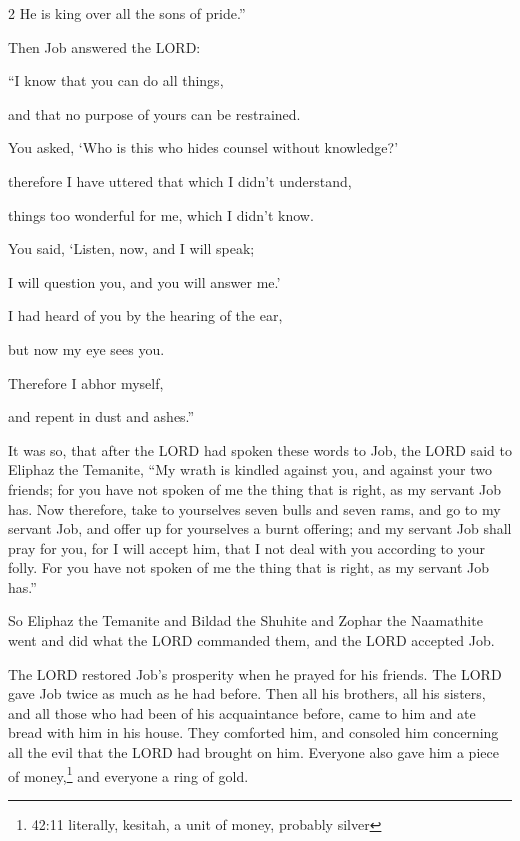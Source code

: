 \begin{multicols}{2}
	He is king over all the sons of pride.”
	
	
	
	\mychapter{} \myverse*{}Then Job answered the LORD:
	
\quad\quad	\myverse{}“I know that you can do all things,
	
	and that no purpose of yours can be restrained.
	
	\myverse{}You asked, ‘Who is this who hides counsel without knowledge?’
	
	therefore I have uttered that which I didn’t understand,
	
	things too wonderful for me, which I didn’t know.
	
	\myverse{}You said, ‘Listen, now, and I will speak;
	
	I will question you, and you will answer me.’
	
	\myverse{}I had heard of you by the hearing of the ear,
	
	but now my eye sees you.
	
	\myverse{}Therefore I abhor myself,
	
	and repent in dust and ashes.”
	
\end{multicols}
\myverse{}It was so, that after the LORD had spoken these words to Job,
the LORD said to Eliphaz the Temanite, “My wrath is kindled against you, and against your two friends; for you have not spoken of me the thing that is right, as my servant Job has. \myverse{}Now therefore, take to yourselves seven bulls and seven rams, and go to my servant Job, and offer up for yourselves a burnt offering; and my servant Job shall pray for you, for I will accept him, that I not deal with you according to your folly. For you have not spoken of me the thing that is right, as my servant Job has.”

\myverse{}So Eliphaz the Temanite and Bildad the Shuhite and Zophar the
Naamathite went and did what the LORD commanded them, and the LORD accepted Job.

\myverse{}The LORD restored Job’s prosperity when he prayed for his friends. The LORD gave Job twice as much as he had before. \myverse{}Then all his brothers, all his sisters, and all those who had been of his acquaintance before, came to him and ate bread with him in his house. They comforted him, and consoled him concerning all the evil that the LORD had brought on him. Everyone also gave him a piece of money,\footnote{42:11 literally, kesitah, a unit of money, probably silver} and everyone a ring of gold.

